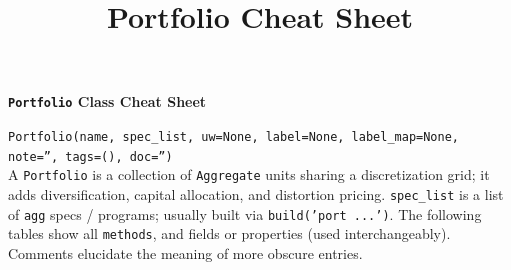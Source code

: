 %
%
%


\title{Portfolio Cheat Sheet}





{\huge{\textbf{\texttt{Portfolio} Class Cheat Sheet}}}

\raggedright
\texttt{\m Portfolio(name, spec\_list, uw=None, label=None, label\_map=None, note='', tags=(), doc='')} \\

A \texttt{Portfolio} is a collection of \texttt{Aggregate} units sharing a discretization grid; it adds diversification, capital allocation, and distortion pricing. \texttt{spec\_list} is a list of \texttt{agg} specs / programs; usually built via \texttt{build('port ...')}.
The following tables show all \texttt{\m methods}, and fields or properties (used interchangeably). Comments elucidate the meaning of more obscure entries.


